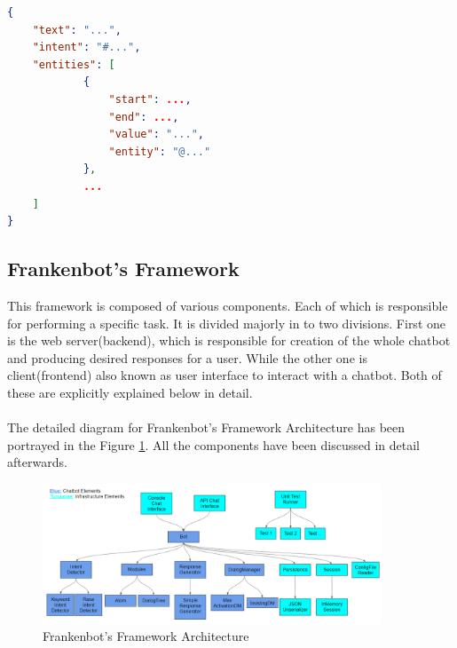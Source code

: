  \begin{lstlisting}[language=json,firstnumber=1]
{
    "text": "...",
    "intent": "#...",
    "entities": [
            {
                "start": ...,
                "end": ...,
                "value": "...",
                "entity": "@..."
            },
            ...
    ]
}
\end{lstlisting}

\subsection{Frankenbot's Framework}
This framework is composed of various components. Each of which is responsible for performing a specific task. It is divided majorly in to two divisions. First one is the web server(backend), which is responsible for creation of the whole chatbot and producing desired responses for a user. While the other one is client(frontend) also known as user interface to interact with a chatbot. Both of these are explicitly explained below in detail.
\\~\\
The detailed diagram for Frankenbot's Framework Architecture has been portrayed in the Figure \ref{fig:frankArch}. All the components have been discussed in detail afterwards.

\begin{figure}[!h]
    \centering
    \includegraphics[width=0.9\textwidth]{img/Frankenbot_Architecture.PNG}
    \caption{Frankenbot's Framework Architecture}
    \label{fig:frankArch}
\end{figure} 

